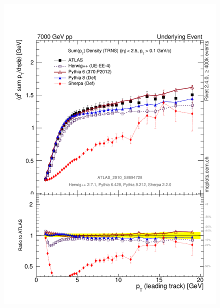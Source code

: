 \begin{figure}[t]
  \centering
  \includegraphics[scale=0.375]{uemb-hard-sumpt-vs-pt.pdf}~

\end{figure}
